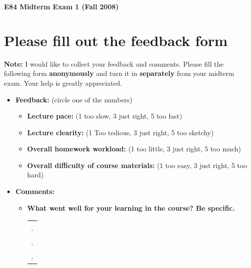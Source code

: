  \usepackage{html}
 
 \begin{center}
 {\Large \bf  E84 Midterm Exam 1 (Fall 2008)}
 \end{center}

 \section*{Please fill out the feedback form}

 {\bf Note: } I would like to collect your feedback and comments. Please fill
 the following form {\bf anonymously} and turn it in {\bf separately} from your 
 midterm exam. Your help is greatly appreciated.

 \begin{itemize}
 \item {\bf Feedback:} (circle one of the numbers)
 \begin{itemize}

 \item {\bf Lecture pace:} (1 too slow, 3 just right, 5 too fast)


 \item {\bf Lecture clearity:} (1 Too tedious, 3 just right, 5 too sketchy)


 \item {\bf Overall homework workload:} (1 too little, 3 just right, 5 too much)


 \item {\bf Overall difficulty of course materials:} (1 too easy, 3 just right, 5 too hard)

 \end{itemize} 

 \item {\bf Comments:}
 \begin{itemize}

 \item {\bf What went well for your learning in the course? Be specific.}

 \begin{tabular}{l}
 .  \\
 .  \\
 .  \\
 \end{tabular}
 \vskip 5cm


\end{itemize}
\end{itemize}
